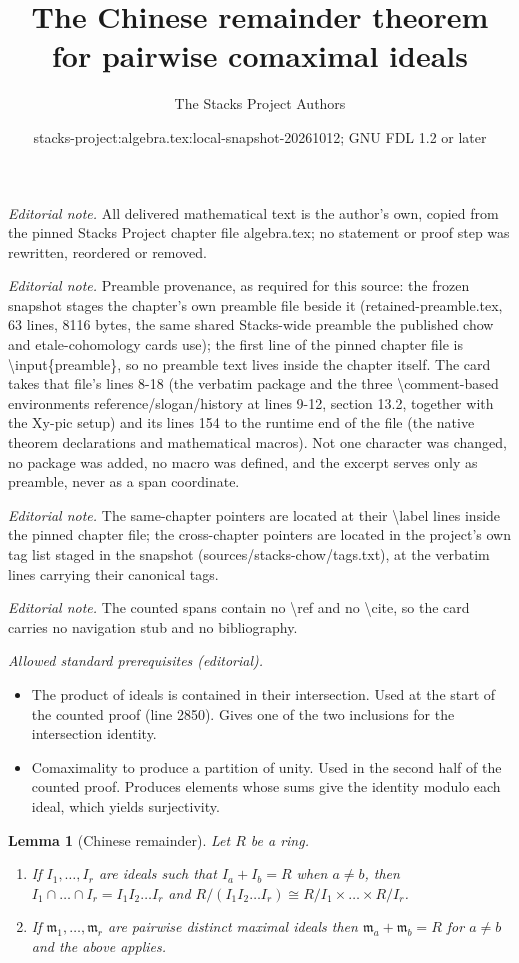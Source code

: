 \documentclass[10pt,a4paper]{amsart}
\title{The Chinese remainder theorem for pairwise comaximal ideals}
\author{The Stacks Project Authors}
\date{stacks-project:algebra.tex:local-snapshot-20261012; GNU FDL 1.2 or later}
\theoremstyle{plain}
\newtheorem{lemma}[subsection]{Lemma}
\theoremstyle{definition}
\theoremstyle{remark}
\numberwithin{equation}{subsection}
\begin{document}
\maketitle
\noindent\textit{Editorial note.} All delivered mathematical text is the author's own, copied from the pinned Stacks Project chapter file algebra.tex; no statement or proof step was rewritten, reordered or removed.\par\medskip
\noindent\textit{Editorial note.} Preamble provenance, as required for this source: the frozen snapshot stages the chapter's own preamble file beside it (retained-preamble.tex, 63 lines, 8116 bytes, the same shared Stacks-wide preamble the published chow and etale-cohomology cards use); the first line of the pinned chapter file is \textbackslash{}input\{preamble\}, so no preamble text lives inside the chapter itself. The card takes that file's lines 8-18 (the verbatim package and the three \textbackslash{}comment-based environments reference/slogan/history at lines 9-12, section 13.2, together with the Xy-pic setup) and its lines 154 to the runtime end of the file (the native theorem declarations and mathematical macros). Not one character was changed, no package was added, no macro was defined, and the excerpt serves only as preamble, never as a span coordinate.\par\medskip
\noindent\textit{Editorial note.} The same-chapter pointers are located at their \textbackslash{}label lines inside the pinned chapter file; the cross-chapter pointers are located in the project's own tag list staged in the snapshot (sources/stacks-chow/tags.txt), at the verbatim lines carrying their canonical tags.\par\medskip
\noindent\textit{Editorial note.} The counted spans contain no \textbackslash{}ref and no \textbackslash{}cite, so the card carries no navigation stub and no bibliography.\par\medskip
\noindent\textit{Allowed standard prerequisites (editorial).}\begin{itemize}
\item The product of ideals is contained in their intersection. Used at the start of the counted proof (line 2850). Gives one of the two inclusions for the intersection identity.
\item Comaximality to produce a partition of unity. Used in the second half of the counted proof. Produces elements whose sums give the identity modulo each ideal, which yields surjectivity.
\end{itemize}\medskip
\begin{lemma}[Chinese remainder]
\label{lemma-chinese-remainder}
Let $R$ be a ring.
\begin{enumerate}
\item If $I_1, \ldots, I_r$ are ideals such that $I_a + I_b = R$
when $a \not = b$, then $I_1 \cap \ldots \cap I_r =
I_1I_2\ldots I_r$ and $R/(I_1I_2\ldots I_r)
\cong R/I_1 \times \ldots \times R/I_r$.
\item If $\mathfrak m_1, \ldots, \mathfrak m_r$ are pairwise distinct maximal
ideals then $\mathfrak m_a + \mathfrak m_b = R$ for $a \not = b$ and the
above applies.
\end{enumerate}
\end{lemma}
\end{document}
